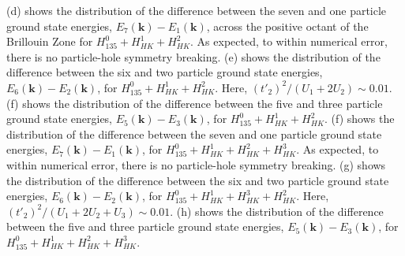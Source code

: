 \documentclass[prb,aps,amssymb,twocolumn,notitlepage]{revtex4-2}
\begin{document}
\begin{figure*}
{(d) shows the distribution of the difference between the seven and one particle ground state energies, $E_{7}(\mathbf{k})-E_{1}(\mathbf{k})$, across the positive octant of the Brillouin Zone for $H^{0}_{135}+H^{1}_{HK}+H^{2}_{HK}$. 
As expected, to within numerical error, there is no particle-hole symmetry breaking.
(e) shows the distribution of the difference between the six and two particle ground state energies, $E_{6}(\mathbf{k})-E_{2}(\mathbf{k})$, for $H^{0}_{135}+H^{1}_{HK}+H^{2}_{HK}$. 
Here, $(t'_{2})^2/(U_{1}+2U_{2})\sim 0.01$.
(f) shows the distribution of the difference between the five and three particle ground state energies, $E_{5}(\mathbf{k})-E_{3}(\mathbf{k})$, for $H^{0}_{135}+H^{1}_{HK}+H^{2}_{HK}$. 
(f) shows the distribution of the difference between the seven and one particle ground state energies, $E_{7}(\mathbf{k})-E_{1}(\mathbf{k})$, for $H^{0}_{135}+H^{1}_{HK}+H^{2}_{HK}+H^{3}_{HK}$. 
As expected, to within numerical error, there is no particle-hole symmetry breaking.
(g) shows the distribution of the difference between the six and two particle ground state energies, $E_{6}(\mathbf{k})-E_{2}(\mathbf{k})$, for $H^{0}_{135}+H^{1}_{HK}+H^{3}_{HK}+H^{2}_{HK}$. 
Here, $(t'_{2})^2/(U_{1}+2U_{2}+U_{3})\sim 0.01$.
(h) shows the distribution of the difference between the five and three particle ground state energies, $E_{5}(\mathbf{k})-E_{3}(\mathbf{k})$, for $H^{0}_{135}+H^{1}_{HK}+H^{2}_{HK}+H^{3}_{HK}$. 
}
\label{fig:ParticleHoleBrillouinZone135}
\end{figure*}
\end{document}
